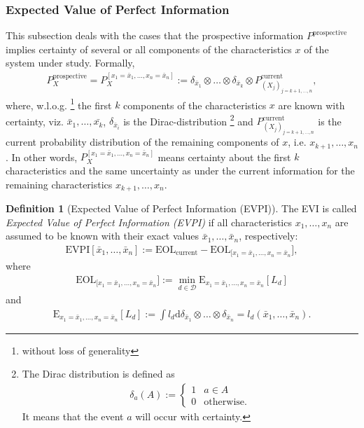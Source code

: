 \documentclass[a4paper,10pt,twoside,pagesize,abstracton]{scrartcl}
\renewcommand{\d}{\mathrm{d}\!} %
\newcommand{\E}[2][]{\mathrm{E}_{#1}\left[#2\right]} %
\newcommand{\EOL}[1][]{\mathrm{EOL}_{#1}} %
\newcommand{\EVPI}{\mathrm{EVPI}} %
\theoremstyle{plain}%
\theoremstyle{definition}
\newtheorem{defn}[thm]{Definition}
\theoremstyle{remark}
\begin{document}
\subsubsection{Expected Value of Perfect Information}
This subsection deals with the cases that the prospective information $P^\mathrm{prospective}$ implies certainty of several or all components of the characteristics $x$ of the system under study. Formally,
\begin{align}
 P_X^{\mathrm{prospective}} = P_X^{[x_1 =\bar{x}_1, \ldots, x_n = \bar{x}_n]} 
      := \delta_{\bar{x}_1} \otimes \ldots \otimes \delta_{\bar{x}_k} \otimes P_{\left(X_j\right)_{j={k+1, \ldots, n}}}^{\mathrm{current}},
\end{align}
where, w.l.o.g.%
  \footnote{%
    without loss of generality
  } %
the first $k$ components of the characteristics $x$ are known with certainty, viz. $\bar{x}_1, \ldots, \bar{x_k}$, $\delta_{\bar{x}_i}$ is the Dirac-distribution%
  \footnote{%
    The Dirac distribution is defined as
    \begin{align*}
      \delta_{a} (A) := 
	\begin{cases}
	  1 	&	a \in A\\
	  0	&	\textrm{otherwise}.
        \end{cases}
      \end{align*}
      It means that the event $a$ will occur with certainty.
    } %
and $P_{\left(X_j\right)_{j={k+1, \ldots, n}}}^{\mathrm{current}}$ is the current probability distribution of the remaining components of $x$, i.e. $x_{k+1}, \ldots, x_n$. In other words, $P_X^{[x_1 =\bar{x}_1, \ldots, x_n = \bar{x}_n]}$ means certainty about the first $k$ characteristics and the same uncertainty as under the current information for the remaining characteristics $x_{k+1}, \ldots, x_n$. 
\begin{defn}[Expected Value of Perfect Information (EVPI)]
The EVI is called \emph{Expected Value of Perfect Information (EVPI)} if all characteristics $x_1,\ldots, x_n$ are assumed to be known with their exact values $\bar{x}_1, \ldots, \bar{x}_n$, respectively:
\begin{align}
   \EVPI[\bar{x}_1, \ldots, \bar{x}_n] := \EOL[\mathrm{current}] - \EOL[[x_1 =\bar{x}_1, \ldots, x_n = \bar{x}_n]],
\end{align}
where 
\begin{align}
  \EOL[[x_1 =\bar{x}_1, \ldots, x_n = \bar{x}_n]] := \min_{d\in\mathcal{D}} \E[x_1 =\bar{x}_1, \ldots, x_n = \bar{x}_n]{L_d}
\end{align}
and 
\begin{align}
   \E[x_1 =\bar{x}_1, \ldots, x_n = \bar{x}_n]{L_d} := \int l_d \d \delta_{\bar{x}_1} \otimes \ldots \otimes \delta_{\bar{x}_n} = l_d \left( \bar{x}_1, \ldots, \bar{x}_n \right).
\end{align}
\end{defn}
\end{document}
